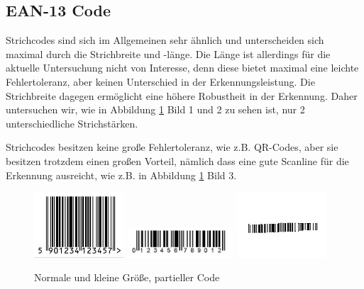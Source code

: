 \subsection*{EAN-13 Code}
\writtenby{\dcauthornameriren}%
Strichcodes sind sich im Allgemeinen sehr ähnlich und unterscheiden sich maximal durch die Strichbreite und -länge. Die Länge ist allerdings für die aktuelle Untersuchung nicht von Interesse, denn diese bietet maximal eine leichte Fehlertoleranz, aber keinen Unterschied in der Erkennungsleistung. Die Strichbreite dagegen ermöglicht eine höhere Robustheit in der Erkennung. Daher untersuchen wir, wie in Abbildung \ref*{fig:eannormal} Bild 1 und 2 zu sehen ist, nur 2 unterschiedliche Strichstärken. 

Strichcodes besitzen keine große Fehlertoleranz, wie z.B. QR-Codes, aber sie besitzen trotzdem einen großen Vorteil, nämlich dass eine gute Scanline für die Erkennung ausreicht, wie z.B. in Abbildung \ref*{fig:eannormal} Bild 3.
\begin{figure}[H]
  \centering
  \includegraphics[width=0.30\textwidth]{img/EAN13/perfect_01.jpg}
  \includegraphics[width=0.35\textwidth]{img/EAN13/perfect_02.jpg}
  \includegraphics[width=0.30\textwidth]{img/EAN13/compensation_01.jpg}
  \caption{Normale und kleine Größe, partieller Code}
  \label{fig:eannormal}
\end{figure}

